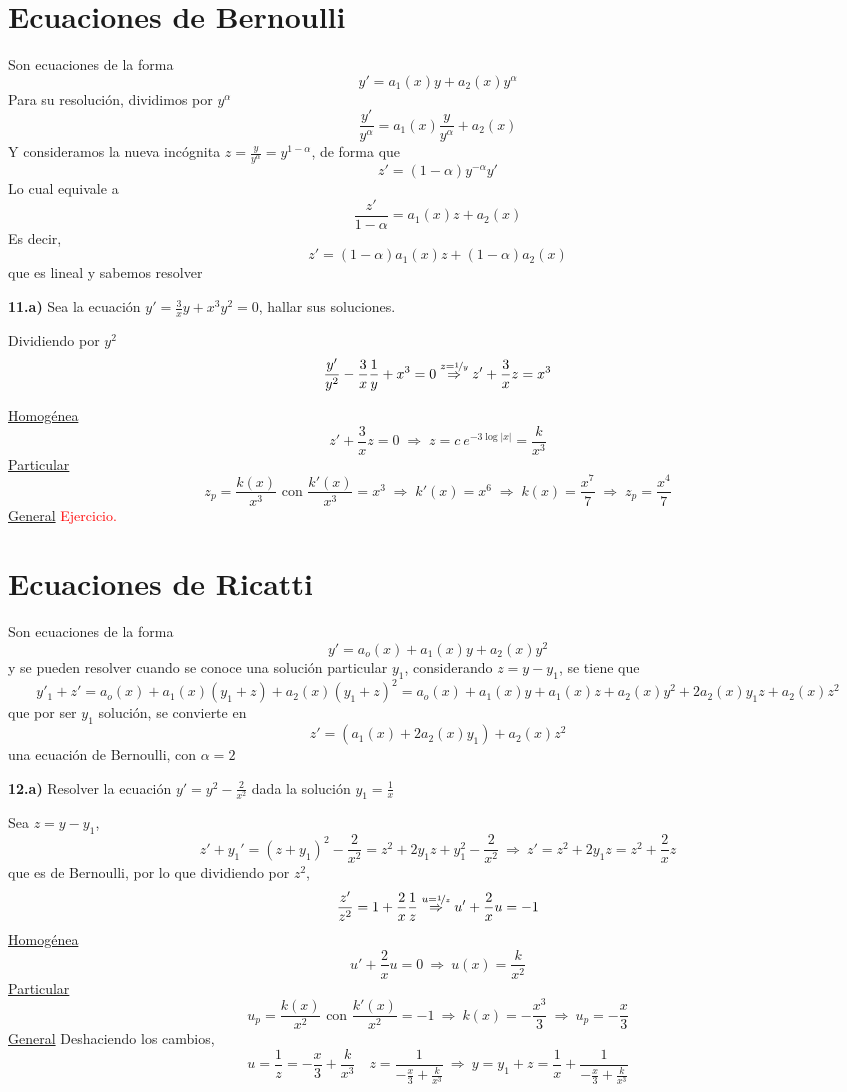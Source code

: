 \section{Ecuaciones de Bernoulli}
Son ecuaciones de la forma
$$y'=a_1(x)y+a_2(x)y^{\alpha}$$
Para su resolución, dividimos por $y^{\alpha}$
$$\dfrac{y'}{y^{\alpha}}=a_1(x)\dfrac{y}{y^{\alpha}}+a_2(x)$$
Y consideramos la nueva incógnita $z=\frac{y}{y^{\alpha}}=y^{1-\alpha}$, de forma que 
$$z'=(1-\alpha) y^{-\alpha} y'$$
Lo cual equivale a 
$$\dfrac{z'}{1-\alpha}=a_1(x)z+a_2(x)$$
Es decir, $$z'=(1-\alpha)a_1(x)z+(1-\alpha)a_2(x)$$
que es lineal y sabemos resolver
\begin{ejer}
    \textbf{11.a)} Sea la ecuación $y'=\frac{3}{x}y+x^3y^2=0$, hallar sus soluciones.
\end{ejer}
\begin{sol}
    Dividiendo por $y^2$
    $$\dfrac{y'}{y^2}-\dfrac{3}{x}\dfrac{1}{y}+x^3=0 \overset{z=\nicefrac{1}{y}}{\Rightarrow} z'+\dfrac{3}{x}z=x^3$$

    \underline{Homogénea}
$$z'+\dfrac{3}{x}z=0 \; \Rightarrow \; z=c \: e^{-3\log|x|}=\dfrac{k}{x^3}$$
\underline{Particular}
$$z_p=\dfrac{k(x)}{x^3} \text{ con } \dfrac{k'(x)}{x^3}=x^3 \; \Rightarrow \; k'(x)=x^6 \; \Rightarrow \; k(x)=\dfrac{x^7}{7} \; \Rightarrow \; z_p=\dfrac{x^4}{7}$$
\underline{General} \textcolor{red}{Ejercicio.}
\end{sol}
\section{Ecuaciones de Ricatti}
Son ecuaciones de la forma
$$y'=a_o(x)+a_1(x)y+a_2(x)y^2$$
y se pueden resolver cuando se conoce una solución particular $y_1$, considerando 
$z=y-y_1$, se tiene que
$$y'_1+z'=a_o(x)+a_1(x)(y_1+z)+a_2(x)(y_1+z)^2=a_o(x)+a_1(x)y+a_1(x)z+a_2(x)y^2+2a_2(x)y_1z+a_2(x)z^2$$
que por ser $y_1$ solución, se convierte en 
$$z'=(a_1(x)+2a_2(x)y_1)+a_2(x)z^2$$
una ecuación de Bernoulli, con $\alpha=2$
\begin{ejer}
    \textbf{12.a)} Resolver la ecuación $y'=y^2-\frac{2}{x^2}$ dada la solución $y_1=\frac{1}{x}$ 
\end{ejer}
\begin{sol}
    Sea $z=y-y_1$, 
    $$z'+y_1'=(z+y_1)^2-\dfrac{2}{x^2}=z^2+2y_1z+y_1^2-\dfrac{2}{x^2} \: \Rightarrow \: z'=z^2+2y_1z=z^2+\dfrac{2}{x}z$$
    que es de Bernoulli, por lo que dividiendo por $z^2$,
    $$\dfrac{z'}{z^2}=1+\dfrac{2}{x} \dfrac{1}{z} \overset{u=\nicefrac{1}{z}}{\Rightarrow} u'+\dfrac{2}{x}u=-1$$
    \underline{Homogénea}
    $$u'+\dfrac{2}{x}u=0 \: \Rightarrow \: u(x)=\dfrac{k}{x^2}$$
    \underline{Particular}
    $$u_p=\dfrac{k(x)}{x^2} \text{ con } \dfrac{k'(x)}{x^2}=-1 \: \Rightarrow \: k(x)=-\dfrac{x^3}{3} \: \Rightarrow \: u_p=-\dfrac{x}{3}$$
    \underline{General} Deshaciendo los cambios, 
    $$u=\dfrac{1}{z}=-\dfrac{x}{3}+\dfrac{k}{x^3} \quad z=\dfrac{1}{-\frac{x}{3}+\frac{k}{x^3}} \: \Rightarrow \: y=y_1+z=\dfrac{1}{x}+\dfrac{1}{-\frac{x}{3}+\frac{k}{x^3}} $$
\end{sol}
